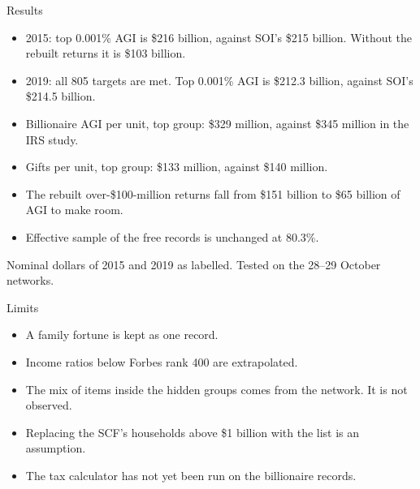 \begin{frame}{Results}
  \small
  \begin{itemize}
    \item 2015: top 0.001\% AGI is \$216 billion, against SOI's \$215 billion. Without the rebuilt
          returns it is \$103 billion.
    \item 2019: all 805 targets are met. Top 0.001\% AGI is \$212.3 billion, against SOI's \$214.5 billion.
    \item Billionaire AGI per unit, top group: \$329 million, against \$345 million in the IRS study.
    \item Gifts per unit, top group: \$133 million, against \$140 million.
    \item The rebuilt over-\$100-million returns fall from \$151 billion to \$65 billion of AGI to make room.
    \item Effective sample of the free records is unchanged at 80.3\%.
  \end{itemize}
  \par\vfill{\scriptsize\color{yalegrey}Nominal dollars of 2015 and 2019 as labelled. Tested on the
    28--29 October networks.}
\end{frame}

\begin{frame}{Limits}
  \small
  \begin{itemize}
    \item A family fortune is kept as one record.
    \item Income ratios below Forbes rank 400 are extrapolated.
    \item The mix of items inside the hidden groups comes from the network. It is not observed.
    \item Replacing the SCF's households above \$1 billion with the list is an assumption.
    \item The tax calculator has not yet been run on the billionaire records.
  \end{itemize}
\end{frame}


